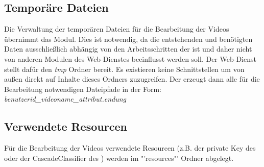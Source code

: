 \subsection{Temporäre Dateien}
Die Verwaltung der temporären Dateien für die Bearbeitung der Videos übernimmt das  Modul. Dies ist notwendig, da die entstehenden und benötigten Daten ausschließlich abhängig von den Arbeitsschritten der  ist und daher nicht von anderen Modulen des Web-Dienstes beeinflusst werden soll. Der Web-Dienst stellt dafür den \textit{tmp} Ordner bereit. Es existieren keine Schnittstellen um von außen direkt auf Inhalte dieses Ordners zuzugreifen.\newline
Der  erzeugt dann alle für die Bearbeitung notwendigen Dateipfade in der Form:\newline
\textit{benutzerid\_videoname\_attribut.endung}

\subsection{Verwendete Resourcen}
Für die Bearbeitung der Videos verwendete Resourcen (z.B. der private Key des  oder der CascadeClassifier des ) werden im "'resources"' Ordner abgelegt.
\newpage
